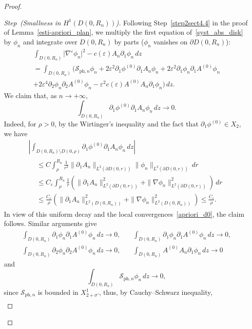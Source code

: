 \documentclass[AHL,Unicode,longabstracts,published]{cedram}
\newcommand*\p{\partial}
\newcommand{\phl}{\mathrm{ph}}
\newcommand*\BS{\mathcal{S}}
\newcommand*\ii{\infty}
\newcommand*\ls{\leqslant }
\newcommand*\e{\varepsilon}
\newcommand*\s{\sigma}
\newcounter{stepcount}
\newenvironment{step}[1]{\refstepcounter{stepcount}\begin{proof}[{Step~\thestepcount}{\;(#1)}]}{\let\qed\relax\end{proof}}
\begin{document}
\begin{proof}
\begin{step}{{Smallness in $ H^1 (D(0, R_n))$}}
Following Step~\ref{step2sect4.4} in the proof of Lemma~\ref{esti-apriori_plan}, we multiply the first equation of~\eqref{syst_abs_disk} by $ \phi_n $ and integrate over $ D(0,R_n) $ by parts ($ \phi_n $ vanishes on $ \p D (0,R_n) $):
\begin{multline}\label{apriori_d1}
 \int_{D(0,R_n)} \lvert \nabla^{\e} \phi_n \rvert^2 - c(\e) A_n \p_1 \phi_n \, dz
\\  = \int_{D(0,R_n)} \Big(\BS_{{\phl},n} \phi_n + 2 \e^2 \p_1 \phi^{(0)} \p_1 A_n \phi_n + 2 \e^2 \p_1 \phi_n \p_1 A^{(0)} \phi_n
\\+ 2 \e^4 \p_2 \phi_n \p_2 A^{(0)} \phi_n - \e^2 c(\e) A^{(0)} A_n \p_1 \phi_n \Big)
\, dz.
\end{multline}
We claim that, as $ n \to +\ii $,
\[
\int_{D(0,R_n)} \p_1 \phi^{(0)} \p_1 A_n \phi_n \, dz \to 0.
\]
Indeed, for $ \rho > 0 $, by the Wirtinger's inequality and the fact that $ \p_1 \phi^{(0)} \in X_2 $, we have
\begin{multline*}
\left \lvert \int_{D(0,R_n) \setminus D(0, \rho) } \p_1 \phi^{(0)} \p_1 A_n \phi_n \, dz \right \rvert \\
\begin{aligned}
& \ls C \int_\rho^{R_n} \frac{1}{r^2} \| \p_1 A_n \|_{L^2\left(\p D(0,r)\right)} \| \phi_n \|_{L^2\left(\p D(0,r)\right)} \, d r
\\ & \ls C_\e \int_\rho^{R_n} \frac{1}{r} \left(\| \p_1 A_n \|_{L^2(\p D(0,r))}^2 + \| \nabla \phi_n \|_{L^2(\p D(0,r))}^2\right) \, d r
\\ & \ls
\frac{C_\e}{ \rho } \left(\| \p_1 A_n \|_{L^2(D(0,R_n))}^2 + \| \nabla \phi_n \|_{L^2(D(0,R_n))}^2\right)
\ls \frac{C_\e}{ \rho }.
\end{aligned}
\end{multline*}
In view of this uniform decay and the local convergences~\eqref{apriori_d0}, the claim follows. Similar arguments give
\begin{align*}
\int_{D(0,R_n)} \p_1 \phi_n \p_1 A^{(0)} \phi_n \, dz \to 0,
\quad
&\int_{D(0,R_n)} \p_1 \phi_n \p_1 A^{(0)} \phi_n \, dz \to 0,
\\
\int_{D(0,R_n)} \p_2 \phi_n \p_2 A^{(0)} \phi_n \, dz \to 0,
\quad
&\int_{D(0,R_n)} A^{(0)} A_n \p_1 \phi_n \, dz \to 0
\end{align*}
and
\[
\int_{D(0,R_n)} \BS_{{\phl},n} \phi_n \, dz \to 0,
\]
since $ \BS_{{\phl},n} $ is bounded in $ X^1_{2+\s'} $, thus, by Cauchy--Schwarz inequality,
\begin{align*}

\end{align*}
\end{step}
\end{proof}
\end{document}
